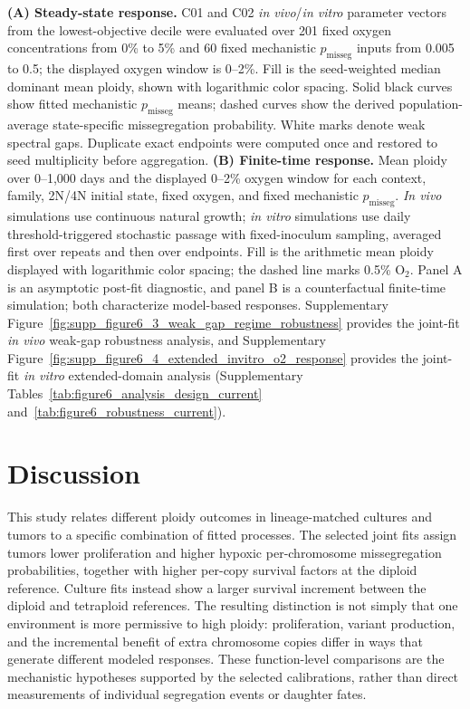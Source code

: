 \documentclass[11pt]{article}
\begin{document}
\noindent\textbf{(A) Steady-state response.} C01 and C02 \textit{in vivo}/\textit{in vitro} parameter vectors from the lowest-objective decile were evaluated over 201 fixed oxygen concentrations from 0\% to 5\% and 60 fixed mechanistic $p_{\mathrm{misseg}}$ inputs from 0.005 to 0.5; the displayed oxygen window is 0--2\%. Fill is the seed-weighted median dominant mean ploidy, shown with logarithmic color spacing. Solid black curves show fitted mechanistic $p_{\mathrm{misseg}}$ means; dashed curves show the derived population-average state-specific missegregation probability. White marks denote weak spectral gaps. Duplicate exact endpoints were computed once and restored to seed multiplicity before aggregation. \textbf{(B) Finite-time response.} Mean ploidy over 0--1,000 days and the displayed 0--2\% oxygen window for each context, family, 2N/4N initial state, fixed oxygen, and fixed mechanistic $p_{\mathrm{misseg}}$. \textit{In vivo} simulations use continuous natural growth; \textit{in vitro} simulations use daily threshold-triggered stochastic passage with fixed-inoculum sampling, averaged first over repeats and then over endpoints. Fill is the arithmetic mean ploidy displayed with logarithmic color spacing; the dashed line marks 0.5\% O$_2$. Panel A is an asymptotic post-fit diagnostic, and panel B is a counterfactual finite-time simulation; both characterize model-based responses. Supplementary Figure~\ref{fig:supp_figure6_3_weak_gap_regime_robustness} provides the joint-fit \textit{in vivo} weak-gap robustness analysis, and Supplementary Figure~\ref{fig:supp_figure6_4_extended_invitro_o2_response} provides the joint-fit \textit{in vitro} extended-domain analysis (Supplementary Tables~\ref{tab:figure6_analysis_design_current} and~\ref{tab:figure6_robustness_current}).


\clearpage
\section*{Discussion}

This study relates different ploidy outcomes in lineage-matched cultures and tumors to a specific combination of fitted processes. The selected joint fits assign tumors lower proliferation and higher hypoxic per-chromosome missegregation probabilities, together with higher per-copy survival factors at the diploid reference. Culture fits instead show a larger survival increment between the diploid and tetraploid references. The resulting distinction is not simply that one environment is more permissive to high ploidy: proliferation, variant production, and the incremental benefit of extra chromosome copies differ in ways that generate different modeled responses. These function-level comparisons are the mechanistic hypotheses supported by the selected calibrations, rather than direct measurements of individual segregation events or daughter fates.
\end{document}
